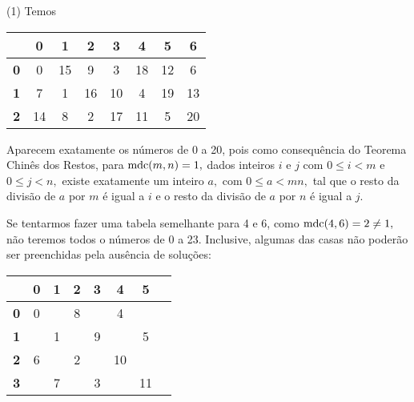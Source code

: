\documentclass[12pt, a4paper]{article}
\newcommand{\mdc}{{\rm mdc}}
\newcommand{\negrito}[1]{\mbox{\boldmath{$#1$}}}
\newcommand{\itens}[1]{\begin{tasks}[label={(tsk[a])},label-width=3.6ex, label-format = {\bfseries}, column-sep = {0pt}](1) #1\end{tasks}}
\newcommand{\alt}[1]{\textcolor{Floresta}{$\negrito{(#1)} $}}
\begin{document}
\begin{solution}
\itens{
\task[\alt{a}]Temos
\begin{center}
\begin{tabular}{|c|c|c|c|c|c|c|c|}
\hline
           & 0  & 1  & 2  & 3  & 4  & 5  &  6  \\ \hline
\textbf{0} & 0  & 15 & 9  & 3  & 18  & 12 & 6   \\ \hline
\textbf{1} & 7  & 1  & 16 & 10 & 4   & 19 & 13  \\ \hline
\textbf{2} & 14 & 8  & 2  & 17 & 11  & 5  & 20  \\ \hline
\end{tabular}
\end{center}
\task[\alt{b}] Aparecem exatamente os números de 0 a 20, pois como consequência do Teorema Chinês dos Restos, para $\mdc(m,n)= 1,$ dados inteiros $i$ e $j$ com $0 \le i < m$ e $0 \le j < n,$ existe exatamente um inteiro $a,$ com $0 \le a < mn,$ tal que o resto da divisão de $a$ por $m$ é igual a $i$ e o resto da divisão de $a$ por $n$ é igual a $j.$ 

Se tentarmos fazer uma tabela semelhante para 4 e 6, como $\mdc(4,6) = 2 \neq 1,$ não teremos todos o números de 0 a 23. Inclusive, algumas das casas não poderão ser preenchidas pela ausência de soluções:
\begin{center}
\begin{tabular}{|c|c|c|c|c|c|c|c|}
\hline
           & 0  & 1  & 2  & 3  & 4  & 5  \\ \hline
\textbf{0} & 0  &    & 8  &    & 4  &    \\ \hline
\textbf{1} &    & 1  &    & 9  &    & 5  \\ \hline
\textbf{2} & 6  &    & 2  &    & 10 &    \\ \hline
\textbf{3} &    & 7  &    & 3  &    & 11 \\ \hline
\end{tabular}
\end{center}
}
\end{solution}
\end{document}
